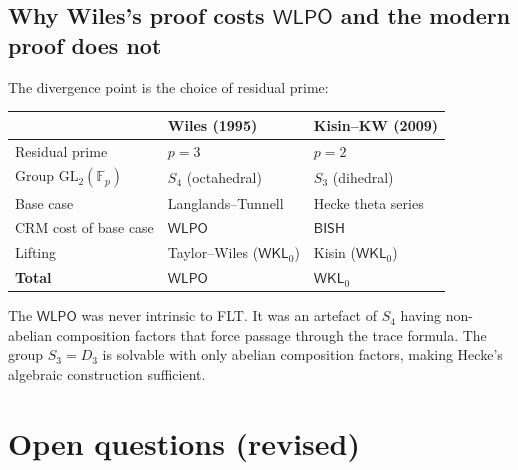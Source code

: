 \documentclass[11pt]{article}
\theoremstyle{plain}
\theoremstyle{definition}
\theoremstyle{remark}
\newcommand{\F}{\mathbb{F}}
\newcommand{\GL}{\mathrm{GL}}
\newcommand{\BISH}{\mathsf{BISH}}
\newcommand{\WLPO}{\mathsf{WLPO}}
\newcommand{\WKL}{\mathsf{WKL}_0}
\begin{document}
\subsection{Why Wiles's proof costs $\WLPO$ and the modern
  proof does not}

The divergence point is the choice of residual prime:

\begin{center}
\begin{tabular}{lll}
\toprule
 & Wiles (1995) & Kisin--KW (2009) \\
\midrule
Residual prime & $p = 3$ & $p = 2$ \\
Group $\GL_2(\F_p)$ & $S_4$ (octahedral) & $S_3$ (dihedral) \\
Base case & Langlands--Tunnell & Hecke theta series \\
CRM cost of base case & $\WLPO$ & $\BISH$ \\
Lifting & Taylor--Wiles ($\WKL$) & Kisin ($\WKL$) \\
\midrule
\textbf{Total} & $\WLPO$ & $\WKL$ \\
\bottomrule
\end{tabular}
\end{center}

The $\WLPO$ was never intrinsic to FLT.  It was an artefact
of $S_4$ having non-abelian composition factors that force
passage through the trace formula.  The group $S_3 = D_3$ is
solvable with only abelian composition factors, making Hecke's
algebraic construction sufficient.


\section{Open questions (revised)}\label{sec:open-revised}
\end{document}
